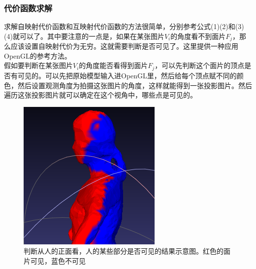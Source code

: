 \documentclass[11pt,a4,notitlepage]{article}
\begin{document}
\begin{CJK}{UTF8}{gkai}
\subsubsection*{代价函数求解}
求解自映射代价函数和互映射代价函数的方法很简单，分别参考公式(1)(2)和(3)(4)就可以了。其中要注意的一点是，如果在某张图片$V_{i}$的角度看不到面片$F_{j}$，那么应该设置自映射代价为无穷。这就需要判断是否可见了。这里提供一种应用OpenGL的参考方法。\\
假如要判断在某张图片$V_{i}$的角度能否看得到面片$F_{j}$，可以先判断这个面片的顶点是否有可见的。可以先把原始模型输入进OpenGL里，然后给每个顶点赋不同的颜色，然后设置观测角度为拍摄这张图片的角度，这样就能得到一张投影图片。然后遍历这张投影图片就可以确定在这个视角中，哪些点是可见的。\\
 \begin{figure}[h]
	\centering
	\includegraphics{cansee.png}
	\caption{判断从人的正面看，人的某些部分是否可见的结果示意图。红色的面片可见，蓝色不可见}
\end{figure}

\end{CJK}
\end{document}
